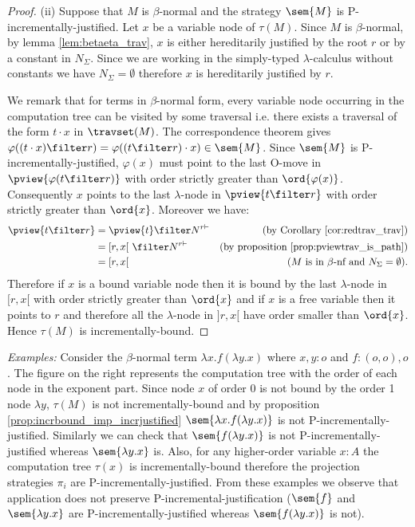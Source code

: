 \begin{proof}
\noindent (ii) Suppose that $M$ is $\beta$-normal and the strategy
$\sem{M}$ is P-incrementally-justified. Let $x$ be a variable node of
$\tau(M)$. Since $M$ is $\beta$-normal, by lemma
\ref{lem:betaeta_trav}, $x$ is either hereditarily justified by the root $r$ or by a constant in $N_\Sigma$. Since we are working in the simply-typed
$\lambda$-calculus without constants we have $N_\Sigma = \emptyset$ therefore $x$ is
hereditarily justified by $r$.


We remark that for terms in $\beta$-normal form, every variable node
occurring in the computation tree can be visited by some traversal
i.e. there exists a traversal of the form $t \cdot x$ in
$\travset(M)$. The correspondence theorem gives $\varphi((t \cdot x)
\filter r) = \varphi((t \filter r) \cdot x) \in
\sem{M}$. Since $\sem{M}$ is P-incrementally-justified, $\varphi(x)$
must point to the last O-move in $\pview{\varphi(t \filter
r)}$ with order strictly greater than $\ord{\varphi(x)}$.
Consequently $x$ points to the last $\lambda$-node in $\pview{t
\filter r}$ with order strictly greater than $\ord{x}$. Moreover we
have:
\begin{align*}
\pview{t \filter r} &= \pview{t} \filter N^{r \vdash} & (\mbox{by Corollary \ref{cor:redtrav_trav}}) \\
& = [r,x[\  \filter N^{r \vdash} & (\mbox{by proposition \ref{prop:pviewtrav_is_path}}) \\
& = [r,x[  & (\mbox{$M$ is in $\beta$-nf and $N_\Sigma = \emptyset$}).
\end{align*}
Therefore if $x$ is a bound variable node then it is bound by the
last $\lambda$-node in $[r,x[$ with order strictly greater than
$\ord{x}$ and if $x$ is a free variable then it points to $r$ and
therefore all the $\lambda$-node in $]r,x[$ have order smaller than
$\ord{x}$. Hence $\tau(M)$ is incrementally-bound.
\end{proof}



\noindent \emph{Examples:} Consider the $\beta$-normal term $\lambda
x . f (\lambda y .x)$ where $x,y:o$ and $f:(o,o),o$. The figure on
the right represents the computation tree with the order of each
node in the exponent part. Since node $x$ of order $0$ is not bound
by the order 1 node $\lambda y$, $\tau(M)$ is not
incrementally-bound and by proposition
\ref{prop:incrbound_imp_incrjustified} $\sem{\lambda x . f (\lambda
y .x)}$ is not P-incrementally-justified. Similarly we can check that
$\sem{f (\lambda y .x)}$ is not P-incrementally-justified
whereas $\sem{\lambda y. x}$ is.
Also, for any higher-order variable $x:A$ the computation tree
$\tau(x)$ is incrementally-bound therefore the projection
strategies $\pi_i$ are P-incrementally-justified. From these examples
we observe that application does not preserve
P-incremental-justification ($\sem{f}$ and $\sem{\lambda y. x}$ are
P-incrementally-justified whereas $\sem{f (\lambda y .x)}$ is not).

